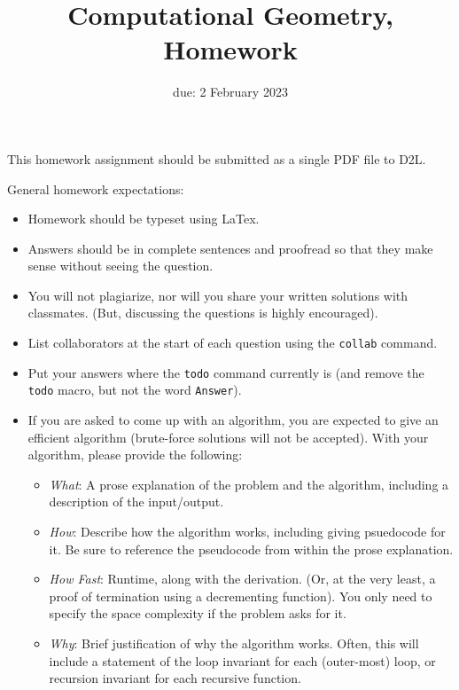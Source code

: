 \documentclass{article}
\title{Computational Geometry, Homework \hwnum}
\date{due: 2 February 2023}
\author{\todo{Your Name Here}}
\begin{document}
\maketitle

This homework assignment should be
submitted as a single PDF file to D2L.

General homework expectations:
\begin{itemize}
    \item Homework should be typeset using LaTex.
    \item Answers should be in complete sentences and proofread so that they
        make sense without seeing the question.
    \item You will not plagiarize, nor will you share your written solutions
        with classmates. (But, discussing the questions is highly encouraged).
    \item List collaborators at the start of each question using the
        \texttt{collab} command.
    \item Put your answers where the \texttt{todo} command currently is (and
        remove the \texttt{todo} macro, but not the word \texttt{Answer}).
    \item If you are asked to come up with an algorithm, you are
        expected to give an efficient algorithm (brute-force solutions will not
        be accepted). With your algorithm, please provide the following:
        \begin{itemize}
            \item \emph{What}: A prose explanation of the problem and the algorithm,
                including a description of the input/output.
            \item \emph{How}: Describe how the algorithm works, including giving
                psuedocode for it.  Be sure to reference the pseudocode
                from within the prose explanation.
            \item \emph{How Fast}: Runtime, along with the derivation.  (Or, at
                the very least, a proof of termination using a decrementing
                function).  You only need to specify the space complexity if the
                problem asks for it.
           \item \emph{Why}: Brief justification of why the algorithm works.
               Often, this will include a statement of the loop invariant for each
               (outer-most) loop, or recursion invariant for each recursive function.
        \end{itemize}
\end{itemize}
\end{document}
